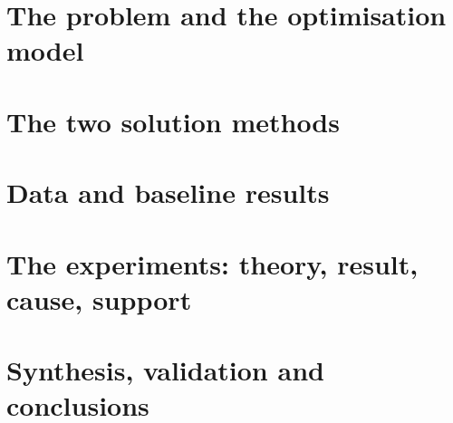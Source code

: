 \documentclass[11pt,a4paper]{article}
\renewcommand{\_}{\origunderscore\allowbreak}
\theoremstyle{definition}
\begin{document}
\tableofcontents
\newpage

\part{The problem and the optimisation model}



\part{The two solution methods}


\part{Data and baseline results}


\part{The experiments: theory, result, cause, support}




\part{Synthesis, validation and conclusions}

\end{document}
